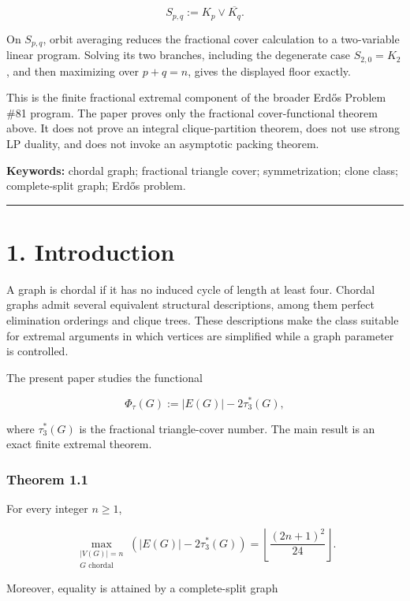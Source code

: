 \documentclass[
  11pt,
]{article}
\begin{document}
\[
S_{p,q}:=K_p\vee\overline{K_q}.
\]

On \(S_{p,q}\), orbit averaging reduces the fractional cover calculation
to a two-variable linear program. Solving its two branches, including
the degenerate case \(S_{2,0}=K_2\), and then maximizing over \(p+q=n\),
gives the displayed floor exactly.

This is the finite fractional extremal component of the broader Erdős
Problem \#81 program. The paper proves only the fractional
cover-functional theorem above. It does not prove an integral
clique-partition theorem, does not use strong LP duality, and does not
invoke an asymptotic packing theorem.

\textbf{Keywords:} chordal graph; fractional triangle cover;
symmetrization; clone class; complete-split graph; Erdős problem.

\begin{center}\rule{0.5\linewidth}{0.5pt}\end{center}

\section{1. Introduction}\label{introduction}

A graph is chordal if it has no induced cycle of length at least four.
Chordal graphs admit several equivalent structural descriptions, among
them perfect elimination orderings and clique trees. These descriptions
make the class suitable for extremal arguments in which vertices are
simplified while a graph parameter is controlled.

The present paper studies the functional

\[
\Phi_\tau(G):=|E(G)|-2\tau_3^*(G),
\]

where \(\tau_3^*(G)\) is the fractional triangle-cover number. The main
result is an exact finite extremal theorem.

\subsubsection{Theorem 1.1}\label{theorem-1.1}

For every integer \(n\ge1\),

\[
\boxed{
\max_{\substack{|V(G)|=n\\G\text{ chordal}}}
\left(
|E(G)|-2\tau_3^*(G)
\right)
=
\left\lfloor\frac{(2n+1)^2}{24}\right\rfloor.
}
\]

Moreover, equality is attained by a complete-split graph
\end{document}
